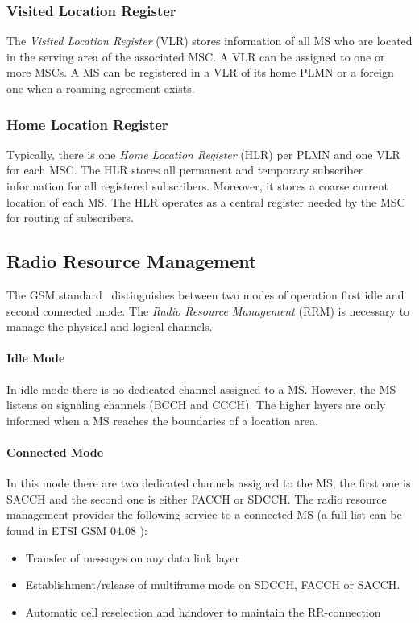 \documentclass[master,english]{hgbthesis}
\begin{document}
\subsubsection{Visited Location Register}
The \emph{Visited Location Register} (VLR) stores information of all MS who are located in the serving area of the associated MSC. A VLR can be assigned to one or more MSCs. A MS can be registered in a VLR of its home PLMN or a foreign one when a roaming agreement exists.
\subsubsection{Home Location Register}
Typically, there is one \emph{Home Location Register} (HLR) per PLMN and one VLR for each MSC. The HLR stores all permanent and temporary subscriber information for all registered subscribers. Moreover, it stores a coarse current location of each MS. The HLR operates as a central register needed by the MSC for routing of subscribers.
\subsection{Radio Resource Management}
The GSM standard~\cite{Etsi1994} distinguishes between two modes of operation first idle and second connected mode. The \emph{Radio Resource Management} (RRM) is necessary to manage the physical and logical channels.
\paragraph{Idle Mode}
In idle mode there is no dedicated channel assigned to a MS. However, the MS listens on signaling channels (BCCH and CCCH). The higher layers are only informed when a MS reaches the boundaries of a location area.
\paragraph{Connected Mode}
\label{subsub:connected}
In this mode there are two dedicated channels assigned to the MS, the first one is SACCH and the second one is either FACCH or SDCCH.
The radio resource management provides the following service to a connected MS (a full list can be found in ETSI GSM 04.08 \cite{Etsi1994}):
\begin{itemize}
	\item Transfer of messages on any data link layer
	\item Establishment/release of multiframe mode on SDCCH, FACCH or SACCH.
	\item Automatic cell reselection and handover to maintain the RR-connection
\end{itemize}
\end{document}
